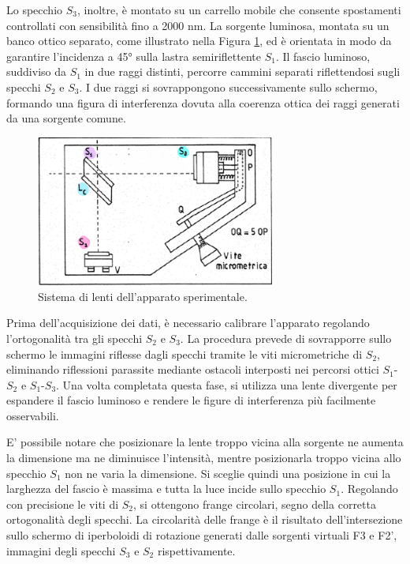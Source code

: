 \documentclass[a4paper,12pt]{article}
\begin{document}
Lo specchio \(S_3\), inoltre, è montato su un carrello mobile che consente spostamenti controllati con sensibilità fino a 2000 nm. La sorgente luminosa, montata su un banco ottico separato, come illustrato nella Figura \ref{fig:Sistema_lenti}, ed è orientata in modo da garantire l’incidenza a 45° sulla lastra semiriflettente \(S_1\). Il fascio luminoso, suddiviso da \(S_1\) in due raggi distinti, percorre cammini separati riflettendosi sugli specchi \(S_2\) e \(S_3\). I due raggi si sovrappongono successivamente sullo schermo, formando una figura di interferenza dovuta alla coerenza ottica dei raggi generati da una sorgente comune.

\begin{figure}[H]
    \centering
    \includegraphics[width=0.7\textwidth]{apparato1.png}
    \caption{Sistema di lenti dell'apparato sperimentale.}
    \label{fig:Sistema_lenti}
\end{figure}

Prima dell’acquisizione dei dati, è necessario calibrare l’apparato regolando l’ortogonalità tra gli specchi \(S_2\) e \(S_3\). La procedura prevede di sovrapporre sullo schermo le immagini riflesse dagli specchi tramite le viti micrometriche di \(S_2\), eliminando riflessioni parassite mediante ostacoli interposti nei percorsi ottici \(S_1\)-\(S_2\) e \(S_1\)-\(S_3\). Una volta completata questa fase, si utilizza una lente divergente per espandere il fascio luminoso e rendere le figure di interferenza più facilmente osservabili. 

E' possibile notare che posizionare la lente troppo vicina alla sorgente ne aumenta la dimensione ma ne diminuisce l’intensità, mentre posizionarla troppo vicina allo specchio \(S_1\) non ne varia la dimensione. Si sceglie quindi una posizione in cui la larghezza del fascio è massima e tutta la luce incide sullo specchio \(S_1\). Regolando con precisione le viti di \(S_2\), si ottengono frange circolari, segno della corretta ortogonalità degli specchi. La circolarità delle frange è il risultato dell’intersezione sullo schermo di iperboloidi di rotazione generati dalle sorgenti virtuali F3 e F2', immagini degli specchi \(S_3\) e \(S_2\) rispettivamente. 
\end{document}
